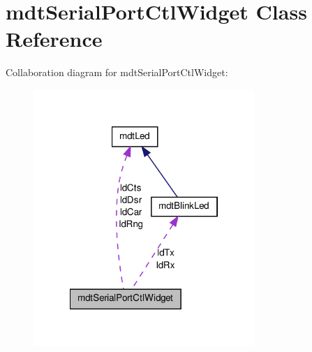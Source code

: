 \hypertarget{classmdt_serial_port_ctl_widget}{
\section{mdtSerialPortCtlWidget Class Reference}
\label{classmdt_serial_port_ctl_widget}
}


Collaboration diagram for mdtSerialPortCtlWidget:\nopagebreak
\begin{figure}[H]
\begin{center}
\leavevmode
\includegraphics[width=237pt]{classmdt_serial_port_ctl_widget__coll__graph}
\end{center}
\end{figure}
